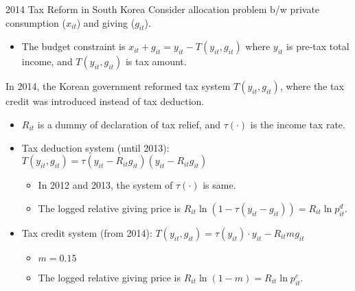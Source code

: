 \documentclass[
  ignorenonframetext,
  aspectratio=169,
]{beamer}
\providecommand{\tightlist}{%
  \setlength{\itemsep}{0pt}\setlength{\parskip}{0pt}}
\begin{document}
\begin{frame}{2014 Tax Reform in South Korea}
\protect\hypertarget{tax-reform-in-south-korea}{}
Consider allocation problem b/w private consumption (\(x_{it}\)) and giving (\(g_{it}\)).

\begin{itemize}
\tightlist
\item
  The budget constraint is \(x_{it} + g_{it} = y_{it} - T(y_{it}, g_{it})\) where \(y_{it}\) is pre-tax total income, and \(T(y_{it}, g_{it})\) is tax amount.
\end{itemize}

In 2014, the Korean government reformed tax system \(T(y_{it}, g_{it})\), where the tax credit was introduced instead of tax deduction.

\begin{itemize}
\tightlist
\item
  \(R_{it}\) is a dummy of declaration of tax relief, and \(\tau(\cdot)\) is the income tax rate.
\item
  Tax deduction system (until 2013): \(T(y_{it}, g_{it}) = \tau(y_{it} - R_{it} g_{it}) (y_{it} - R_{it} g_{it})\)

  \begin{itemize}
  \tightlist
  \item
    In 2012 and 2013, the system of \(\tau(\cdot)\) is same.
  \item
    The logged relative giving price is \(R_{it} \ln(1 - \tau(y_{it} - g_{it})) = R_{it} \ln p^d_{it}\).
  \end{itemize}
\item
  Tax credit system (from 2014): \(T(y_{it}, g_{it}) = \tau(y_{it}) \cdot y_{it} - R_{it} m g_{it}\)

  \begin{itemize}
  \tightlist
  \item
    \(m = 0.15\)
  \item
    The logged relative giving price is \(R_{it} \ln(1 - m) = R_{it} \ln p^c_{it}\).
  \end{itemize}
\end{itemize}
\end{frame}
\end{document}
